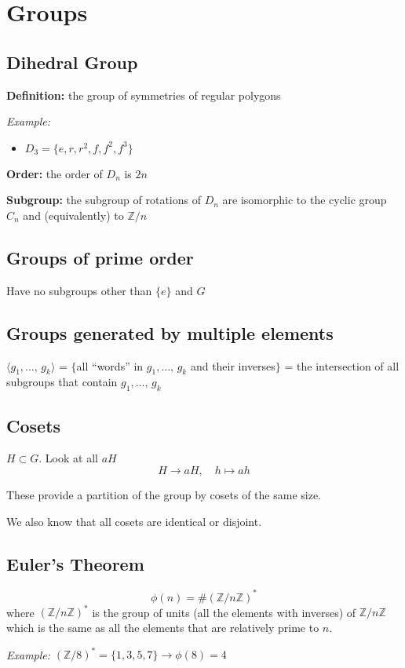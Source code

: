 \documentclass[12pt]{article}
\newcommand{\Z}{\mathbb{Z}}
\newcommand{\brak}[1]{\langle #1 \rangle}
\begin{document}
\section*{Groups}
\subsection*{Dihedral Group}
\textbf{Definition:} the group of symmetries of regular polygons 

\emph{Example:}
\begin{itemize}
    \item $D_3 = \{e, r, r^2, f, f^2, f^3\}$
\end{itemize}

\textbf{Order:} the order of $D_n$ is $2n$ 

\textbf{Subgroup:} the subgroup of rotations of $D_n$ are isomorphic to the cyclic group $C_n$ and (equivalently) to $\Z/n$

\subsection*{Groups of prime order}
Have no subgroups other than $\{e\}$ and $G$

\subsection*{Groups generated by multiple elements}
$\brak{g_1, \dots,\, g_k}$ = $\{$all ``words'' in $g_1, \dots,\, g_k$ and their inverses$\}$ = the intersection of all subgroups that contain $g_1, \dots,\, g_k$

\subsection*{Cosets}
$H \subset G$. Look at all $aH$ 
\[H \to aH, \quad h \mapsto ah\]

These provide a partition of the group by cosets of the same size. 

We also know that all cosets are identical or disjoint.

\subsection*{Euler's Theorem}
\[\phi(n) = \#(\Z/n\Z)^*\]
where $(\Z/n\Z)^*$ is the group of units (all the elements with inverses) of $\Z/n\Z$ which is the same as all the elements that are relatively prime to $n$. 

\emph{Example:} $(\Z/8)^* = \{1, 3, 5, 7\} \longrightarrow \phi(8) = 4$
\end{document}
